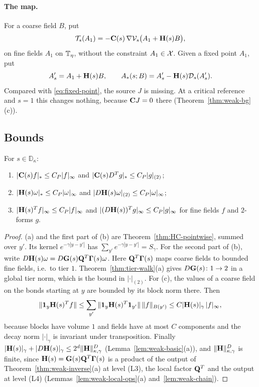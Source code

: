 \paragraph{The map.} For a coarse field $B$, put
\begin{equation}\label{eq:Ts}
\mathcal T_s(A_1)=-\mathbf C(s)\,\nabla\mathcal V_s\big(A_1+\mathbf H(s)B\big),
\end{equation}
on fine fields $A_1$ on $\mathbb T_\eta$, without the constraint $A_1\in\mathcal X$. Given a fixed point $A_1$, put
\[
A'_s=A_1+\mathbf H(s)B,\qquad A_*(s;B)=A'_s-\mathbf H(s)\mathcal D_s(A'_s).
\]
Compared with \eqref{eq:fixed-point}, the source $J$ is missing. At a critical reference and $s=1$ this changes nothing, because $\mathbf C J=0$ there (Theorem~\ref{thm:weak-bg}(c)).

\subsection{Bounds}

\begin{lemma}\label{lem:weak-bg-linear}
For $s\in\mathbb D_\kappa$:
\begin{enumerate}[label=(\alph*)]
\item $|\mathbf C(s)f|_*\le C_P|f|_\infty$ and $|\mathbf C(s)D^Tg|_*\le C_P|g|_{(2)}$;
\item $|\mathbf H(s)\omega|_*\le C_P|\omega|_\infty$ and $|D\mathbf H(s)\omega|_{(2)}\le C_P|\omega|_\infty$;
\item $|\mathbf H(s)^Tf|_\infty\le C_P|f|_\infty$ and $|(D\mathbf H(s))^Tg|_\infty\le C_P|g|_\infty$ for fine fields $f$ and $2$-forms $g$.
\end{enumerate}

\end{lemma}

\begin{proof}
(a) and the first part of (b) are Theorem~\ref{thm:HC-pointwise}, summed over $y'$. Its kernel $e^{-\gamma|y-y'|}$ has $\sum_{y'}e^{-\gamma|y-y'|}=S_\gamma$. For the second part of (b), write $D\mathbf H(s)\omega=D\mathbf G(s)\mathbf Q^T\boldsymbol\Gamma(s)\omega$. Here $\mathbf Q^T\boldsymbol\Gamma(s)$ maps coarse fields to bounded fine fields, i.e.\ to tier $1$. Theorem~\ref{thm:tier-walk}(a) gives $D\mathbf G(s)\colon1\to2$ in a global tier norm, which is the bound in $|\cdot|_{(2)}$. For (c), the values of a coarse field on the bonds starting at $y$ are bounded by its block norm there. Then
\[
\|\mathbf 1_y\mathbf H(s)^Tf\|\le\sum_{y'}\|\mathbf 1_y\mathbf H(s)^T\mathbf 1_{y'}\|\,\|f\|_{B(y')}\le C|\mathbf H(s)|_\gamma\,|f|_\infty ,
\]
because blocks have volume $1$ and fields have at most $C$ components and the decay norm $|\cdot|_\gamma$ is invariant under transposition. Finally $|\mathbf H(s)|_\gamma+|D\mathbf H(s)|_\gamma\le2^d\|\mathbf H\|^D_{\kappa,\gamma}$ (Lemma~\ref{lem:weak-basic}(a)), and $\|\mathbf H\|^D_{\kappa,\gamma}$ is finite, since $\mathbf H(s)=\mathbf G(s)\mathbf Q^T\boldsymbol\Gamma(s)$ is a product of the output of Theorem~\ref{thm:weak-inverse}(a) at level (L3), the local factor $\mathbf Q^T$ and the output at level (L4) (Lemmas~\ref{lem:weak-local-ops}(a) and~\ref{lem:weak-chain}).
\end{proof}

